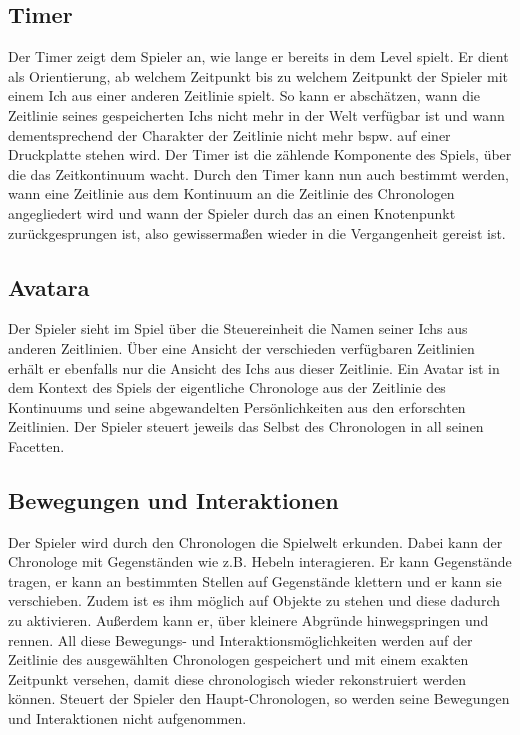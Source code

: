 \subsection{Timer}
Der Timer zeigt dem Spieler an, wie lange er bereits in dem Level spielt. Er dient als Orientierung, ab welchem Zeitpunkt bis zu welchem Zeitpunkt der Spieler mit einem Ich aus einer anderen Zeitlinie spielt. So kann er abschätzen, wann die Zeitlinie seines gespeicherten Ichs nicht mehr in der Welt verfügbar ist und wann dementsprechend der Charakter der Zeitlinie nicht mehr bspw. auf einer Druckplatte stehen wird. Der Timer ist die zählende Komponente des Spiels, über die das Zeitkontinuum wacht. Durch den Timer kann nun auch bestimmt werden, wann eine Zeitlinie aus dem Kontinuum an die Zeitlinie des Chronologen angegliedert wird und wann der Spieler durch das  an einen Knotenpunkt zurückgesprungen ist, also gewissermaßen wieder in die Vergangenheit gereist ist.

\subsection{Avatara}
Der Spieler sieht im  Spiel über die Steuereinheit die Namen seiner Ichs aus anderen Zeitlinien. Über eine Ansicht der verschieden verfügbaren Zeitlinien erhält er ebenfalls nur die Ansicht des Ichs aus dieser Zeitlinie. Ein Avatar ist in dem Kontext des Spiels der eigentliche Chronologe aus der Zeitlinie des Kontinuums und seine abgewandelten Persönlichkeiten aus den erforschten Zeitlinien. Der Spieler steuert jeweils das Selbst des Chronologen in all seinen Facetten.

\subsection{Bewegungen und Interaktionen}
Der Spieler wird durch den Chronologen die Spielwelt erkunden. Dabei kann der Chronologe mit Gegenständen wie z.B. Hebeln interagieren. Er kann Gegenstände tragen, er kann an bestimmten Stellen auf Gegenstände klettern und er kann sie verschieben. Zudem ist es ihm möglich auf Objekte zu stehen und diese dadurch zu aktivieren. Außerdem kann er, über kleinere Abgründe hinwegspringen und rennen. All diese Bewegungs- und Interaktionsmöglichkeiten werden auf der Zeitlinie des ausgewählten Chronologen gespeichert und mit einem exakten Zeitpunkt versehen, damit diese chronologisch wieder rekonstruiert werden können. Steuert der Spieler den Haupt-Chronologen, so werden seine Bewegungen und Interaktionen nicht aufgenommen.

